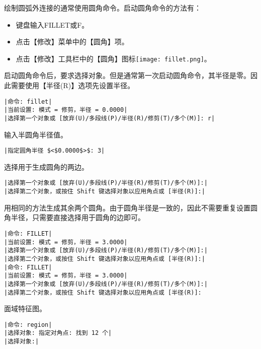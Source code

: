 \begin{procedure}
绘制圆弧外连接的通常使用圆角命令。启动圆角命令的方法有：
\begin{itemize}
\item 键盘输入FILLET或F。
\item 点击【修改】菜单中的【圆角】项。
\item 点击【修改】工具栏中的【圆角】图标\texttt{[image: fillet.png]}。
\end{itemize}
启动圆角命令后，要求选择对象。但是通常第一次启动圆角命令，其半径是零。因此需要使用【半径(R)】选项先设置半径。
\begin{lstlisting}
|命令: fillet|
|当前设置: 模式 = 修剪，半径 = 0.0000|
|选择第一个对象或 [放弃(U)/多段线(P)/半径(R)/修剪(T)/多个(M)]: r| 
\end{lstlisting}
输入半圆角半径值。
\begin{lstlisting}
|指定圆角半径 $<$0.0000$>$: 3|
\end{lstlisting}
选择用于生成圆角的两边。
\begin{lstlisting}
|选择第一个对象或 [放弃(U)/多段线(P)/半径(R)/修剪(T)/多个(M)]:|
|选择第二个对象，或按住 Shift 键选择对象以应用角点或 [半径(R)]:|
\end{lstlisting}
用相同的方法生成其余两个圆角。由于圆角半径是一致的，因此不需要重复设置圆角半径，只需要直接选择用于圆角的边即可。
\begin{lstlisting}
|命令: FILLET|
|当前设置: 模式 = 修剪，半径 = 3.0000|
|选择第一个对象或 [放弃(U)/多段线(P)/半径(R)/修剪(T)/多个(M)]:|
|选择第二个对象，或按住 Shift 键选择对象以应用角点或 [半径(R)]:|
|命令: FILLET|
|当前设置: 模式 = 修剪，半径 = 3.0000|
|选择第一个对象或 [放弃(U)/多段线(P)/半径(R)/修剪(T)/多个(M)]:|
|选择第二个对象，或按住 Shift 键选择对象以应用角点或 [半径(R)]:
\end{lstlisting}
\item 面域特征图。
\begin{lstlisting}
|命令: region|
|选择对象: 指定对角点: 找到 12 个|
|选择对象:|
\end{lstlisting}
\end{procedure}

